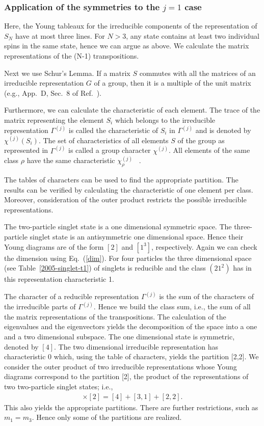 \documentclass[pra,amsfonts,showpacs,preprint,showkeys]{revtex4}
\begin{document}
\subsubsection{Application of the symmetries to the $j=1$ case}
Here, the Young tableaux for the irreducible components of the
representation of $S_N$ have at most three lines. For $N>3$, any
state contains at least two individual spins in the same state,
hence we can argue as above. We calculate the matrix
representations of the
 (N-1) transpositions.

Next we use Schur's Lemma. If a matrix $S$ commutes
with all the matrices of an irreducible representation $G$ of a
group, then it is a multiple of the unit matrix (e.g., App.~D,
Sec.~8 of Ref.~\cite{messiah-62}).


Furthermore, we can calculate the characteristic of each
element. The %
trace of the matrix representing the element $S_i$ which belongs
to the irreducible representation $\Gamma^{(j)}$ is called the
characteristic of $S_i$ in $\Gamma^{(j)}$ and is denoted by
$\chi^{(j)}(S_i)$. The set of characteristics of all elements $S$
of the group as represented in $\Gamma^{(j)}$ is called a group
character $\chi^{(j)}$. All elements of the same class $\rho$ have
the same characteristic $\chi^{(j)}_\rho$ ~\cite{wybourne}.

The tables of characters can be used to find
the appropriate partition. The results can be verified by calculating the
characteristic of one element per class.
Moreover, consideration of the
outer product restricts the possible irreducible representations. %

The two-particle singlet state is a one dimensional symmetric
space. The three-particle singlet state is an antisymmetric one
dimensional space. Hence their Young diagrams are of the form
$[2]$ and $[1^3]$, respectively. Again we can check the dimension
using Eq.~(\ref{dim}). For four particles the three dimensional
space (see Table~\ref{2005-singlet-t1}) of singlets is reducible
and the class $(21^2)$ has in this representation characteristic
1.

The character of a reducible representation $\Gamma^{(j)}$ is
the sum of the characters of the irreducible parts of
$\Gamma^{(j)}$.
Hence we build the class sum, i.e., the sum of all the matrix
representations of the transpositions.
The calculation of the eigenvalues
and the eigenvectors yields the decomposition of  the space
into a one and a two dimensional subspace. The one dimensional
state is symmetric, denoted by $[4]$. The two dimensional irreducible
representation has characteristic 0 which, using the table
of characters, yields the partition [2,2]. We consider the outer product
of two irreducible representations whose Young diagrams correspond
to the partition [2],  the product of the representations of two two-particle singlet
states; i.e.,
\begin{align} [2]\times[2]=[4]+[3,1]+[2,2].\end{align}
This also yields the appropriate partitions.
There are further
restrictions, such as  $m_1=m_3$. Hence only some of the partitions
are realized.
\end{document}
